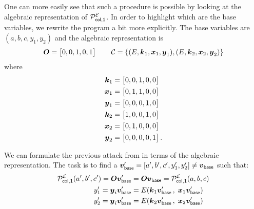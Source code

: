 One can more easily see that such a procedure is possible by looking at the algebraic representation of $\PE[col,1]$.
In order to highlight which are the base variables, we rewrite the program a bit more explicitly.
The base variables are $(a, b, c, y_1, y_2)$ and the algebraic representation is
\[
    \O = \begin{bmatrix} 0, 0, 1, 0, 1 \end{bmatrix} 
        \qquad \C = \{(\E, \v k_1, \v x_1, \v y_1), (\E, \v k_2, \v x_2, \v y_2)\}
\]
where
\begin{align*}
\v k_1 &= \begin{bmatrix} 0, 0, 1, 0, 0 \end{bmatrix} \\
\v x_1 &= \begin{bmatrix} 0, 1, 1, 0, 0 \end{bmatrix} \\
\v y_1 &= \begin{bmatrix} 0, 0, 0, 1, 0 \end{bmatrix} \\
\v k_2 &= \begin{bmatrix} 1, 0, 0, 1, 0 \end{bmatrix} \\
\v x_2 &= \begin{bmatrix} 0, 1, 0, 0, 0 \end{bmatrix} \\
\v y_2 &= \begin{bmatrix} 0, 0, 0, 0, 1 \end{bmatrix}.
\end{align*}

We can formulate the previous attack from in terms of the algebraic representation.
The task is to find a $\v v_\base' = [a', b', c', y_1', y_2'] \neq \v v_\base$ such that:
\begin{align}
\label{constraint_output}
\PE[col,1](a', b', c') = \O \vbase' &= \O \vbase = \PE[col,1](a,b,c) \\
\label{constraint_cipher_1}
y_1' = \vy_i \vbase' &=  \E(\vk_1 \vbase'\,, \; \vx_1 \vbase')\\
\label{constraint_cipher_2}
y_2' = \vy_i \vbase' &=  \E(\vk_2 \vbase'\,, \; \vx_2 \vbase')
\end{align}

